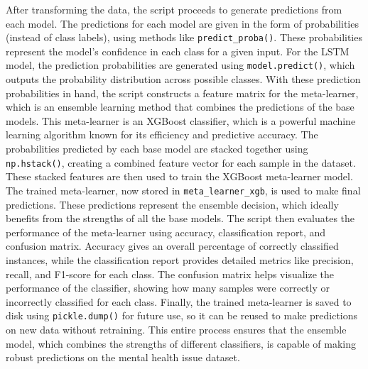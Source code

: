 \vspace{1em}
\noindent
After transforming the data, the script proceeds to generate predictions from each model. The predictions for each model are given in the form of probabilities (instead of class labels), using methods like \texttt{predict\_proba()}. These probabilities represent the model’s confidence in each class for a given input. For the LSTM model, the prediction probabilities are generated using \texttt{model.predict()}, which outputs the probability distribution across possible classes. With these prediction probabilities in hand, the script constructs a feature matrix for the meta-learner, which is an ensemble learning method that combines the predictions of the base models. This meta-learner is an XGBoost classifier, which is a powerful machine learning algorithm known for its efficiency and predictive accuracy. The probabilities predicted by each base model are stacked together using \texttt{np.hstack()}, creating a combined feature vector for each sample in the dataset. These stacked features are then used to train the XGBoost meta-learner model. The trained meta-learner, now stored in \texttt{meta\_learner\_xgb}, is used to make final predictions. These predictions represent the ensemble decision, which ideally benefits from the strengths of all the base models. The script then evaluates the performance of the meta-learner using accuracy, classification report, and confusion matrix. Accuracy gives an overall percentage of correctly classified instances, while the classification report provides detailed metrics like precision, recall, and F1-score for each class. The confusion matrix helps visualize the performance of the classifier, showing how many samples were correctly or incorrectly classified for each class. Finally, the trained meta-learner is saved to disk using \texttt{pickle.dump()} for future use, so it can be reused to make predictions on new data without retraining. This entire process ensures that the ensemble model, which combines the strengths of different classifiers, is capable of making robust predictions on the mental health issue dataset.

\pagebreak

